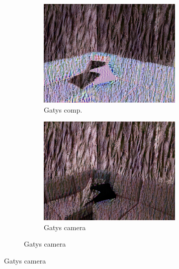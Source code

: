 \begin{figure}[]
\begin{subfigure}{\textwidth}
\begin{subfigure}{0.24\textwidth}
            \centering
            \includegraphics[width=\textwidth]{images/04-experiment02/sofa/wood/gatys_im.jpg}
            \caption*{Gatys comp.}
        \end{subfigure}
        \hfill
        \begin{subfigure}{0.24\textwidth}
            \centering
            \includegraphics[width=\textwidth]{images/04-experiment02/sofa/wood/gatys_proj.jpg}
            \caption*{Gatys camera}
        \end{subfigure}
        

\end{subfigure}
\end{figure}
